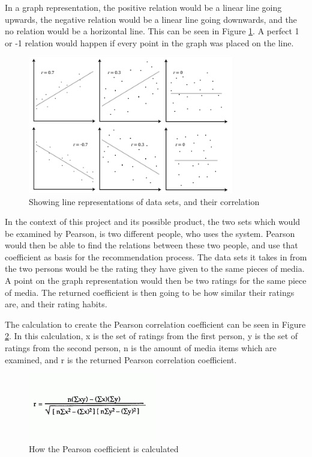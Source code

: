 In a graph representation, the positive relation would be a linear line going upwards, the negative relation would be a linear line going downwards, and the no relation would be a horizontal line. This can be seen in Figure \ref{Pearson1}. A perfect 1 or -1 relation would happen if every point in the graph was placed on the line. \cite{Pearson1}

\begin{figure}[H]
\centering
\includegraphics[width=0.8\textwidth]{Images/pearson1.png}
\caption{Showing line representations of data sets, and their correlation \cite{Pearson2}}
\label{Pearson1}
\end{figure}

In the context of this project and its possible product, the two sets which would be examined by Pearson, is two different people, who uses the system. Pearson would then be able to find the relations between these two people, and use that coefficient as basis for the recommendation process. The data sets it takes in from the two persons would be the rating they have given to the same pieces of media. A point on the graph representation would then be two ratings for the same piece of media. The returned coefficient is then going to be how similar their ratings are, and their rating habits.

The calculation to create the Pearson correlation coefficient can be seen in Figure \ref{PearsonCalc}. In this calculation, x is the set of ratings from the first person, y is the set of ratings from the second person, n is the amount of media items which are examined, and r is the returned Pearson correlation coefficient. \cite{Pearson1}

\begin{figure}[H]
\centering
\includegraphics[width=0.5\textwidth]{Images/pearsonCalc.png}
\caption{How the Pearson coefficient is calculated \cite{Pearson1}}
\label{PearsonCalc}
\end{figure}

